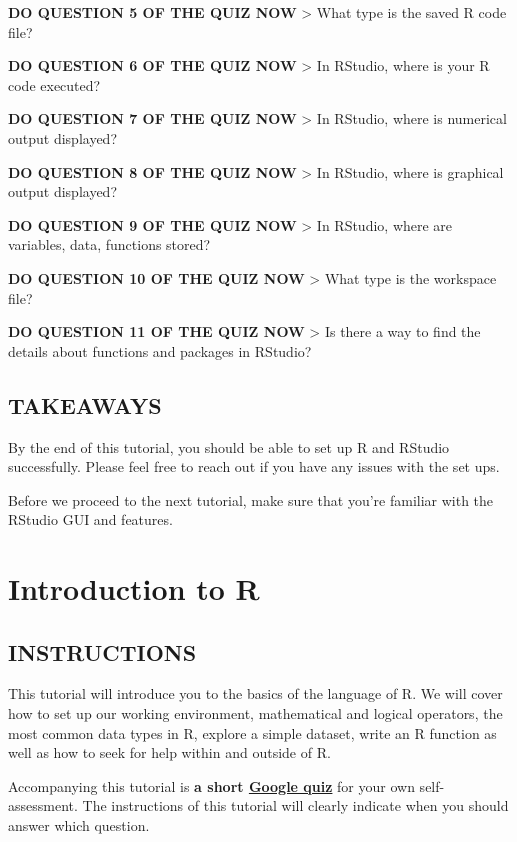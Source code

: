 \documentclass[
]{book}
\begin{document}
\textbf{DO QUESTION 5 OF THE QUIZ NOW}
\textgreater{} What type is the saved R code file?

\textbf{DO QUESTION 6 OF THE QUIZ NOW}
\textgreater{} In RStudio, where is your R code executed?

\textbf{DO QUESTION 7 OF THE QUIZ NOW}
\textgreater{} In RStudio, where is numerical output displayed?

\textbf{DO QUESTION 8 OF THE QUIZ NOW}
\textgreater{} In RStudio, where is graphical output displayed?

\textbf{DO QUESTION 9 OF THE QUIZ NOW}
\textgreater{} In RStudio, where are variables, data, functions stored?

\textbf{DO QUESTION 10 OF THE QUIZ NOW}
\textgreater{} What type is the workspace file?

\textbf{DO QUESTION 11 OF THE QUIZ NOW}
\textgreater{} Is there a way to find the details about functions and packages in RStudio?

\hypertarget{takeaways}{%
\section{TAKEAWAYS}\label{takeaways}}

By the end of this tutorial, you should be able to set up R and RStudio successfully. Please feel free to reach out if you have any issues with the set ups.

Before we proceed to the next tutorial, make sure that you're familiar with the RStudio GUI and features.

\hypertarget{introduction-to-r}{%
\chapter{Introduction to R}\label{introduction-to-r}}

\hypertarget{instructions-1}{%
\section{INSTRUCTIONS}\label{instructions-1}}

This tutorial will introduce you to the basics of the language of R. We will cover how to set up our working environment, mathematical and logical operators, the most common data types in R, explore a simple dataset, write an R function as well as how to seek for help within and outside of R.

Accompanying this tutorial is \textbf{a short \href{https://forms.gle/P5x4pRK39xrA9EJR9}{Google quiz}} for your own self-assessment. The instructions of this tutorial will clearly indicate when you should answer which question.
\end{document}
